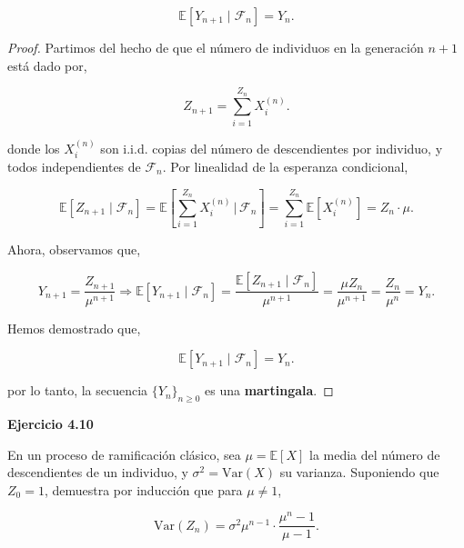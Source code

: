 \documentclass{article}
\begin{document}
\[
\mathbb{E}[Y_{n+1} \mid \mathcal{F}_n] = Y_n.
\]

\begin{proof}
Partimos del hecho de que el número de individuos en la generación $n+1$ está dado por,

\[
Z_{n+1} = \sum_{i=1}^{Z_n} X_i^{(n)}.
\]

donde los $X_i^{(n)}$ son i.i.d. copias del número de descendientes por individuo, y todos independientes de $\mathcal{F}_n$. Por linealidad de la esperanza condicional,

\[
\mathbb{E}[Z_{n+1} \mid \mathcal{F}_n] = \mathbb{E}\left[ \sum_{i=1}^{Z_n} X_i^{(n)} \,\bigg|\, \mathcal{F}_n \right]
= \sum_{i=1}^{Z_n} \mathbb{E}[X_i^{(n)}] = Z_n \cdot \mu.
\]

Ahora, observamos que,

\[
Y_{n+1} = \frac{Z_{n+1}}{\mu^{n+1}} \Rightarrow
\mathbb{E}[Y_{n+1} \mid \mathcal{F}_n]
= \frac{\mathbb{E}[Z_{n+1} \mid \mathcal{F}_n]}{\mu^{n+1}} 
= \frac{\mu Z_n}{\mu^{n+1}} = \frac{Z_n}{\mu^n} = Y_n.
\]

Hemos demostrado que,

\[
\mathbb{E}[Y_{n+1} \mid \mathcal{F}_n] = Y_n.
\]

por lo tanto, la secuencia $\{Y_n\}_{n \geq 0}$ es una \textbf{martingala}.
\end{proof}

\textbf{Ejercicio 4.10}

En un proceso de ramificación clásico, sea $\mu = \mathbb{E}[X]$ la media del número de descendientes de un individuo, y $\sigma^2 = \text{Var}(X)$ su varianza. Suponiendo que $Z_0 = 1$, demuestra por inducción que para $\mu \neq 1$,

\[
\text{Var}(Z_n) = \sigma^2 \mu^{n-1} \cdot \frac{\mu^n - 1}{\mu - 1}.
\]
\end{document}
